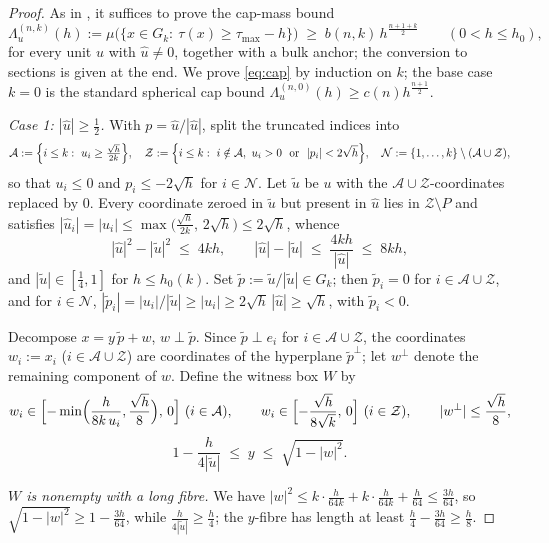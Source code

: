 ﻿\documentclass[11pt]{article}
\begin{document}
\begin{proof}
As in \cite{companion7}, it suffices to prove the cap-mass bound
\begin{equation}\label{eq:cap}
\Lambda^{(n,k)}_u(h):=\mu\bigl(\{x\in G_k:\ \tau(x)\ge\tau_{\max}-h\}\bigr)
\;\ge\;b(n,k)\,h^{\frac{n+1+k}2}
\qquad(0<h\le h_0),
\end{equation}
for every unit $u$ with $\hat u\ne0$, together with a bulk anchor; the
conversion to sections is given at the end.  We prove \eqref{eq:cap} by
induction on $k$; the base case $k=0$ is the standard spherical cap bound
$\Lambda^{(n,0)}_u(h)\ge c(n)h^{\frac{n+1}2}$.

\emph{Case 1: $|\hat u|\ge\frac12$.}  With $p=\hat u/|\hat u|$, split the
truncated indices into
\[
\mathcal A:=\Bigl\{i\le k:\ u_i\ge\tfrac{\sqrt h}{2k}\Bigr\},
\quad
\mathcal Z:=\Bigl\{i\le k:\ i\notin\mathcal A,\
u_i>0\ \text{ or }\ |p_i|<2\sqrt h\Bigr\},
\quad
\mathcal N:=\{1,\dots,k\}\setminus(\mathcal A\cup\mathcal Z),
\]
so that $u_i\le0$ and $p_i\le-2\sqrt h$ for $i\in\mathcal N$.  Let
$\tilde u$ be $u$ with the $\mathcal A\cup\mathcal Z$-coordinates replaced by
$0$.  Every coordinate zeroed in $\tilde u$ but present in $\hat u$ lies in
$\mathcal Z\setminus P$ and satisfies
$|\hat u_i|=|u_i|\le\max\bigl(\tfrac{\sqrt h}{2k},\,2\sqrt h\bigr)\le2\sqrt h$,
whence
\[
|\hat u|^2-|\tilde u|^2\;\le\;4kh,
\qquad
|\hat u|-|\tilde u|\;\le\;\frac{4kh}{|\hat u|}\;\le\;8kh,
\]
and $|\tilde u|\in[\tfrac14,1]$ for $h\le h_0(k)$.  Set
$\tilde p:=\tilde u/|\tilde u|\in G_k$; then $\tilde p_i=0$ for
$i\in\mathcal A\cup\mathcal Z$, and for $i\in\mathcal N$,
$|\tilde p_i|=|u_i|/|\tilde u|\ge|u_i|\ge2\sqrt h\,|\hat u|\ge\sqrt h$, with
$\tilde p_i<0$.

Decompose $x=y\,\tilde p+w$, $w\perp\tilde p$.  Since
$\tilde p\perp e_i$ for $i\in\mathcal A\cup\mathcal Z$, the coordinates
$w_i:=x_i$ ($i\in\mathcal A\cup\mathcal Z$) are coordinates of the
hyperplane $\tilde p^\perp$; let $w^\perp$ denote the remaining component of
$w$.  Define the witness box $W$ by
\[
w_i\in\Bigl[-\min\Bigl(\frac{h}{8k\,u_i},\frac{\sqrt h}8\Bigr),\,0\Bigr]
\ (i\in\mathcal A),
\qquad
w_i\in\Bigl[-\frac{\sqrt h}{8\sqrt k},\,0\Bigr]\ (i\in\mathcal Z),
\qquad
|w^\perp|\le\frac{\sqrt h}8,
\]
\[
1-\frac{h}{4|\tilde u|}\;\le\;y\;\le\;\sqrt{1-|w|^2}.
\]

\emph{$W$ is nonempty with a long fibre.}  We have
$|w|^2\le k\cdot\frac h{64k}+k\cdot\frac h{64k}+\frac h{64}\le\frac{3h}{64}$,
so $\sqrt{1-|w|^2}\ge1-\frac{3h}{64}$, while
$\frac h{4|\tilde u|}\ge\frac h4$; the $y$-fibre has length at least
$\frac h4-\frac{3h}{64}\ge\frac h8$.


\end{proof}
\end{document}

